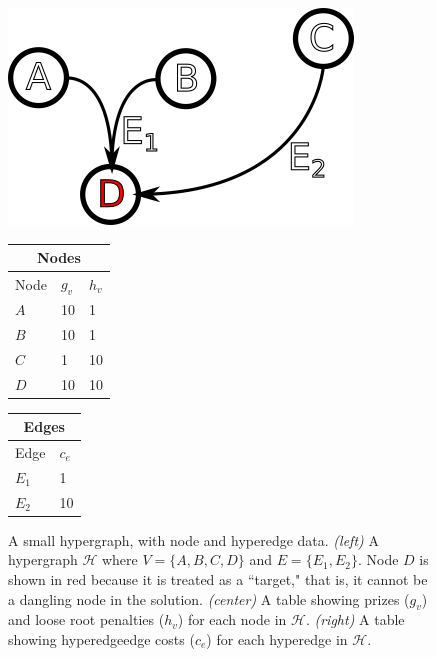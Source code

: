 \documentclass[12pt,twoside]{reedthesis}
\theoremstyle{definition}
\begin{document}
\begin{figure}[th]
  \begin{minipage}[b]{0.30\linewidth}
    \centering
    \includegraphics[width=\linewidth]{dummy-before}
    \par\vspace{0pt}
  \end{minipage}%
  \begin{minipage}[b]{0.30\linewidth}
    \centering%
    \begin{tabular}{ |l|l|l| }%
      \hline%
      \multicolumn{3}{|c|}{Nodes} \\%
      \hline \hline
      Node & $g_v$ &  $h_v$ \\ \hline%
      $A$ & 10 &  1\\ \hline%
      $B$ & 10 &  1\\ \hline%
      $C$ & 1 &  10\\ \hline%
      $D$ & 10 &  10\\ \hline%
    \end{tabular}%
    \par\vspace{0pt}
  \end{minipage}
  \begin{minipage}[b]{0.30\linewidth}
    \centering%
    \begin{tabular}{ |l|l| }%
      \hline%
      \multicolumn{2}{|c|}{Edges} \\%
      \hline \hline
      Edge & $c_e$ \\ \hline%
      $E_1$ & 1 \\ \hline%
      $E_2$ & 10 \\ \hline%
    \end{tabular}%
    \par\vspace{0pt}
  \end{minipage}
\caption[A small hypergraph, with node and edge data.]{A small hypergraph, with node and hyperedge data. \textit{(left)} A hypergraph $\mathcal{H}$ where $V=\{A,B,C,D\}$ and $E=\{E_1,E_2\}$. Node $D$ is shown in red because it is treated as a ``target," that is, it cannot be a dangling node in the solution. \textit{(center)} A table showing prizes ($g_v$) and loose root penalties ($h_v$) for each node in $\mathcal{H}$. \textit{(right)} A table showing hyperedgeedge costs ($c_e$) for each hyperedge in $\mathcal{H}$.}
\label{fig:dummy-before}
\end{figure}
\end{document}
